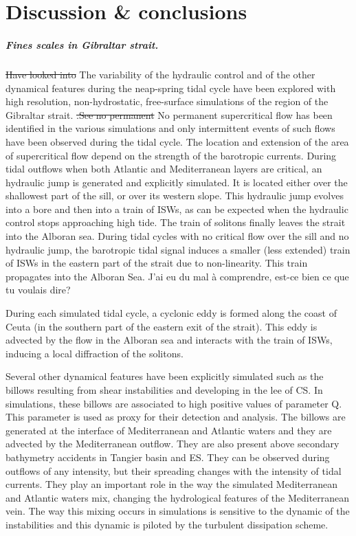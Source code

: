 \section{Discussion \& conclusions}
\color{blue}\subparagraph{Fines scales in Gibraltar strait.}
\sout{Have looked into} The variability of the hydraulic control and of the other dynamical features during the neap-spring tidal cycle have been explored with high resolution, non-hydrostatic, free-surface simulations of the region of the Gibraltar strait. \sout{.See no permanent} No permanent supercritical flow has been identified in the various simulations and only intermittent events of such flows have been observed during the tidal cycle. The location and extension of the area of supercritical flow depend on the strength of the barotropic currents. \color{black}
\color{blue}During tidal outflows when both Atlantic and Mediterranean layers are critical, an hydraulic jump is generated and explicitly simulated. It is located \color{black} either over the shallowest part of the sill, or over its western slope.  \color{blue}This hydraulic jump evolves into a bore and then into a train of ISWs, as can be expected when the hydraulic control stops approaching high tide. The train of solitons finally leaves the strait into the Alboran sea. 
During tidal cycles with no critical flow over the sill and no hydraulic jump, the barotropic tidal signal induces a smaller (less extended) train of ISWs in the eastern part of the strait due to non-linearity. This train propagates into the Alboran Sea.  \color{green}J'ai eu du mal à comprendre, est-ce bien ce que tu voulais dire? \color{black}

 \color{blue}During \color{black} each simulated tidal cycle, a cyclonic eddy is formed along the coast of Ceuta (in the southern part of the eastern exit of the strait). This eddy is advected by the flow in the Alboran sea and interacts with the train of ISWs, \color{blue}inducing a local diffraction of the solitons. \color{black}


\color{blue}Several other dynamical features have been explicitly simulated such as the billows resulting from shear instabilities and developing\color{black} in the lee of CS. In simulations, these billows are associated to high positive values of parameter Q. This parameter is used as proxy for their detection and analysis. The billows are generated at the interface of \color{blue} Mediterranean and Atlantic waters and they are advected by the Mediterranean outflow. They are also present above secondary bathymetry accidents in Tangier basin and ES. They can be observed during outflows of any intensity, but their spreading changes with the intensity of tidal currents. They play an important role in the way the simulated Mediterranean and Atlantic waters mix, changing the hydrological features of the Mediterranean vein. The way this mixing occurs in simulations is sensitive to the dynamic of the instabilities and this dynamic is piloted by the turbulent dissipation scheme. \color{black}

